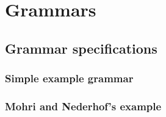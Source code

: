 
\chapter{Grammars} %

\label{app:Grammars} %

\section{Grammar specifications}

\subsection{Simple example grammar} \label{app:simpleGrammar}
 

\pagebreak\subsection{Mohri and Nederhof's example} \label{app:MohriGrammar}
